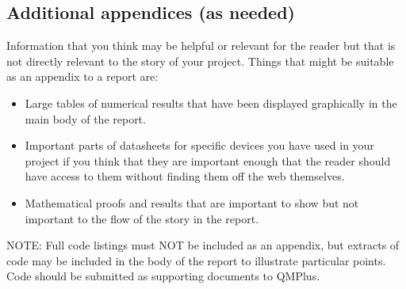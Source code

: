 \subsection*{Additional appendices (as needed)}

Information that you think may be helpful or relevant for the reader but that is not directly relevant to the story of your project. Things that might be suitable as an appendix to a report are:

\begin{itemize}
    \item Large tables of numerical results that have been displayed graphically in the main body of the report.
    \item Important parts of datasheets for specific devices you have used in your project if you think that they are important enough that the reader should have access to them without finding them off the web themselves.
    \item Mathematical proofs and results that are important to show but not important to the flow of the story in the report.
\end{itemize}

NOTE: Full code listings must NOT be included as an appendix, but extracts of code may be included in the body of the report to illustrate particular points. Code should be submitted as supporting documents to QMPlus.

